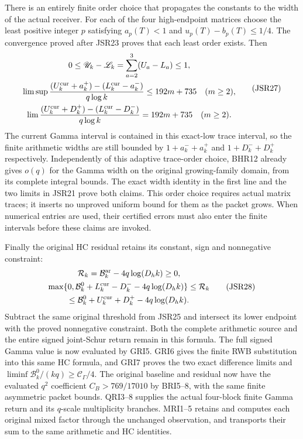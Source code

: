 \documentclass[11pt,a4paper]{article}
\begin{document}
There is an entirely finite order choice that propagates
the constants to the width of the actual receiver.
For each of the four high-endpoint matrices choose the least positive
integer $p$ satisfying $a_p(T)<1$ and
$u_p(T)-b_p(T)\leq1/4$. The convergence proved after
JSR23 proves that each least order exists. Then
\[
\begin{gathered}
 0\leq\mathscr U_k-\mathscr L_k
   =\sum_{a=2}^3(U_a-L_a)\leq1,\\
 \limsup\frac{
   (U_k^{\rm cur}+a_k^+)-(L_k^{\rm cur}-a_k^-)}{q\log k}
   \leq192m+735\quad(m\geq2),\\
 \lim\frac{
   (U_k^{\rm cur}+D_k^+)-(L_k^{\rm cur}-D_k^-)}{q\log k}
   =192m+735\quad(m\geq2).
\end{gathered}\tag{JSR27}
\]
The current Gamma interval is contained in this exact-low
trace interval, so the finite arithmetic widths are still
bounded by $1+a_k^-+a_k^+$ and $1+D_k^-+D_k^+$ respectively.
Independently of this adaptive trace-order choice, BHR12
already gives $o(q)$ for the Gamma width on the original
growing-family domain, from its complete integral bounds.
The exact width identity in the first line and the
two limits in JSR21 prove both claims. This order choice
requires actual matrix traces; it inserts no unproved
uniform bound for them as the packet grows. When numerical
entries are used, their certified errors must also enter
the finite intervals before these claims are invoked.

Finally the original HC residual retains its constant,
sign and nonnegative constraint:
\[
\begin{gathered}
 \mathcal R_k=\mathcal B_k^{\rm ar}-4q\log(D_hk)\geq0,\\
 \max\{0,\mathcal B_k^0+L_k^{\rm cur}-D_k^-
                         -4q\log(D_hk)\}
 \leq\mathcal R_k\\
 \leq\mathcal B_k^0+U_k^{\rm cur}+D_k^+
                         -4q\log(D_hk).
\end{gathered}\tag{JSR28}
\]
Subtract the same original threshold from JSR25 and
intersect its lower endpoint with the proved nonnegative
constraint. Both the complete arithmetic source and the
entire signed joint-Schur return remain in this formula.
The full signed Gamma value is now evaluated by GRI5.
GRI6 gives the finite RWB substitution into this same HC
formula, and GRI7 proves the two exact difference limits
and $\liminf\mathcal B_k^0/(kq)\geq\mathcal C_\Gamma/4$.
The original baseline and residual now have the evaluated
$q^2$ coefficient $C_B>769/17010$ by BRI5--8, with the same
finite asymmetric packet bounds. QRI3--8 supplies the actual
four-block finite Gamma return and its $q$-scale multiplicity
branches. MRI1--5 retains and computes each original mixed
factor through the unchanged observation, and transports their
sum to the same arithmetic and HC identities.
\end{document}

